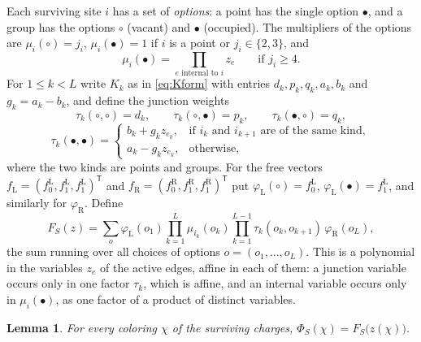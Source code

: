 \documentclass{amsart}
\newtheorem{lemma}[theorem]{Lemma}
\theoremstyle{definition}
\theoremstyle{remark}
\numberwithin{equation}{section}
\newcommand{\vac}{\circ}
\newcommand{\occ}{\bullet}
\begin{document}
Each surviving site $i$ has a set of \emph{options}: a point has the single option $\occ$, and a group has the options $\vac$ (vacant) and $\occ$ (occupied). The multipliers of the options are $\mu_i(\vac)=j_i$, $\mu_i(\occ)=1$ if $i$ is a point or $j_i\in\{2,3\}$, and
\[
\mu_i(\occ)=\prod_{e\text{ internal to }i}z_e\qquad\text{if }j_i\ge4 .
\]
For $1\le k<L$ write $K_k$ as in \eqref{eq:Kform} with entries $d_k,p_k,q_k,a_k,b_k$ and $g_k=a_k-b_k$, and define the junction weights
\[
\tau_k(\vac,\vac)=d_k,\qquad\tau_k(\vac,\occ)=p_k,\qquad\tau_k(\occ,\vac)=q_k,
\]
\[
\tau_k(\occ,\occ)=\begin{cases}b_k+g_kz_{e_k},&\text{if }i_k\text{ and }i_{k+1}\text{ are of the same kind},\\ a_k-g_kz_{e_k},&\text{otherwise},\end{cases}
\]
where the two kinds are points and groups. For the free vectors $f_{\mathrm L}=(f^{\mathrm L}_0,f^{\mathrm L}_1,f^{\mathrm L}_1)^{\mathsf T}$ and $f_{\mathrm R}=(f^{\mathrm R}_0,f^{\mathrm R}_1,f^{\mathrm R}_1)^{\mathsf T}$ put $\varphi_{\mathrm L}(\vac)=f^{\mathrm L}_0$, $\varphi_{\mathrm L}(\occ)=f^{\mathrm L}_1$, and similarly for $\varphi_{\mathrm R}$. Define
\begin{equation}\label{eq:F}
F_S(z)=\sum_{o}\varphi_{\mathrm L}(o_1)\prod_{k=1}^{L}\mu_{i_k}(o_k)\prod_{k=1}^{L-1}\tau_k(o_k,o_{k+1})\,\varphi_{\mathrm R}(o_L),
\end{equation}
the sum running over all choices of options $o=(o_1,\dots,o_L)$. This is a polynomial in the variables $z_e$ of the active edges, affine in each of them: a junction variable occurs only in one factor $\tau_k$, which is affine, and an internal variable occurs only in $\mu_i(\occ)$, as one factor of a product of distinct variables.

\begin{lemma}\label{lem:FN}
For every coloring $\chi$ of the surviving charges, $\Phi_S(\chi)=F_S\bigl(z(\chi)\bigr)$.
\end{lemma}
\end{document}
